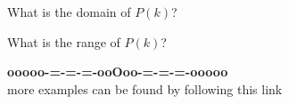 \documentclass{ximera}
\begin{document}
\begin{example}
\begin{question}
What is the domain of $P(k)$?

\begin{multipleChoice}
  \choice {$[-5,0] \cup [1,5]$}
  \choice {$[-5,5]$}
  \choice {$(-5,0] \cup [1,5)$}
  \choice [correct]{$[-5,0) \cup (1,5]$}
  \choice {$[-5,0), (1,5]$}
\end{multipleChoice}

\end{question}






\begin{question} 


What is the range of $P(k)$?

\begin{multipleChoice}
  \choice {$[-6,9]$}
  \choice [correct]{$[-6,-2) \cup [0,9]$}
  \choice {$[-6,-2) \cup [0,5)$}
  \choice {$[-6,-2), [0,9]$}
\end{multipleChoice}

\end{question}






\end{example}










\begin{onlineOnly}
\begin{center}
\textbf{\textcolor{green!50!black}{ooooo-=-=-=-ooOoo-=-=-=-ooooo}} \\

more examples can be found by following this link\\ 

\end{center}
\end{onlineOnly}
\end{document}
